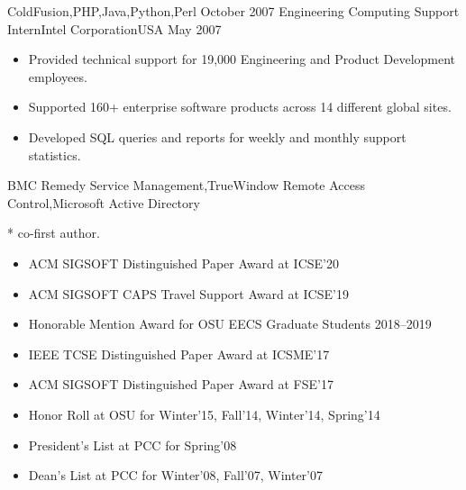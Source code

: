 \documentclass[localFont,alternative]{yaac-another-awesome-cv}
\begin{document}
\begin{experiences}
    {ColdFusion,PHP,Java,Python,Perl}
  \emptySeparator
  \experience
    {October 2007}  {Engineering Computing Support Intern}{Intel Corporation}{USA}
    {May 2007}      {
                      \begin{itemize}
                        \item Provided technical support for 19,000 Engineering and Product Development employees.
                        \item Supported 160+ enterprise software products across 14 different global sites.
                        \item Developed SQL queries and reports for weekly and monthly support statistics.
                      \end{itemize}
                    }
    {BMC Remedy Service Management,TrueWindow Remote Access Control,Microsoft Active Directory}
\end{experiences}

\smallskip
* co-first author.
\begingroup
\renewcommand{\section}[2]{}%
\nocite{*}


\endgroup

\twocolumnsectionright
{
\begin{skills}
\end{skills}}
{
\vspace{1em}
\begin{itemize}
  \item ACM SIGSOFT Distinguished Paper Award at ICSE'20
  \item ACM SIGSOFT CAPS Travel Support Award at ICSE'19
  \item Honorable Mention Award for OSU EECS Graduate Students 2018--2019
  \item IEEE TCSE Distinguished Paper Award at ICSME'17
  \item ACM SIGSOFT Distinguished Paper Award at FSE'17
  \item Honor Roll at OSU for Winter'15, Fall'14, Winter'14, Spring'14
  \item President's List at PCC for Spring'08
  \item Dean's List at PCC for Winter'08, Fall'07, Winter'07
\end{itemize}
}
\end{document}
